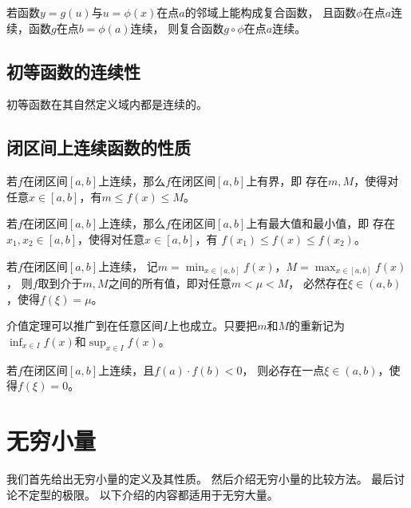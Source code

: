 \begin{theorem}[复合函数的连续性]
   若函数$y=g(u)$与$u=\phi(x)$在点$a$的邻域上能构成复合函数，
   且函数$\phi$在点$a$连续，函数$g$在点$b=\phi(a)$连续，
   则复合函数$g\circ\phi$在点$a$连续。
\end{theorem}

\subsection{初等函数的连续性}
\begin{theorem}[初等函数的连续性]
  初等函数在其自然定义域内都是连续的。
\end{theorem}

\subsection{闭区间上连续函数的性质}
\begin{theorem}[有界性定理]
  若$f$在闭区间$[a,b]$上连续，那么$f$在闭区间$[a,b]$上有界，即
  存在$m,M$，使得对任意$x\in[a,b]$，有$m\le f(x)\le M$。
\end{theorem}

\begin{theorem}[最值定理]
  若$f$在闭区间$[a,b]$上连续，那么$f$在闭区间$[a,b]$上有最大值和最小值，即
  存在$x_1,x_2\in[a,b]$，使得对任意$x\in[a,b]$，有
  $f(x_1)\le f(x)\le f(x_2)$。
\end{theorem}

\begin{theorem}[介值定理]
  若$f$在闭区间$[a,b]$上连续，
  记$m=\min_{x\in[a,b]}f(x)$，$M=\max_{x\in[a,b]}f(x)$，
  则$f$取到介于$m,M$之间的所有值，即对任意$m<\mu<M$，
  必然存在$\xi\in(a,b)$，使得$f(\xi)=\mu$。
\end{theorem}
\begin{remark}
  介值定理可以推广到在任意区间$I$上也成立。只要把$m$和$M$的重新记为
  $\inf_{x\in I}f(x)$和$\sup_{x\in I}f(x)$。
\end{remark}

\begin{theorem}[零点定理]
  若$f$在闭区间$[a,b]$上连续，且$f(a)\cdot f(b) < 0$，
  则必存在一点$\xi\in(a,b)$，使得$f(\xi)=0$。
\end{theorem}

\section{无穷小量}
我们首先给出无穷小量的定义及其性质。
然后介绍无穷小量的比较方法。
最后讨论不定型的极限。
以下介绍的内容都适用于无穷大量。

